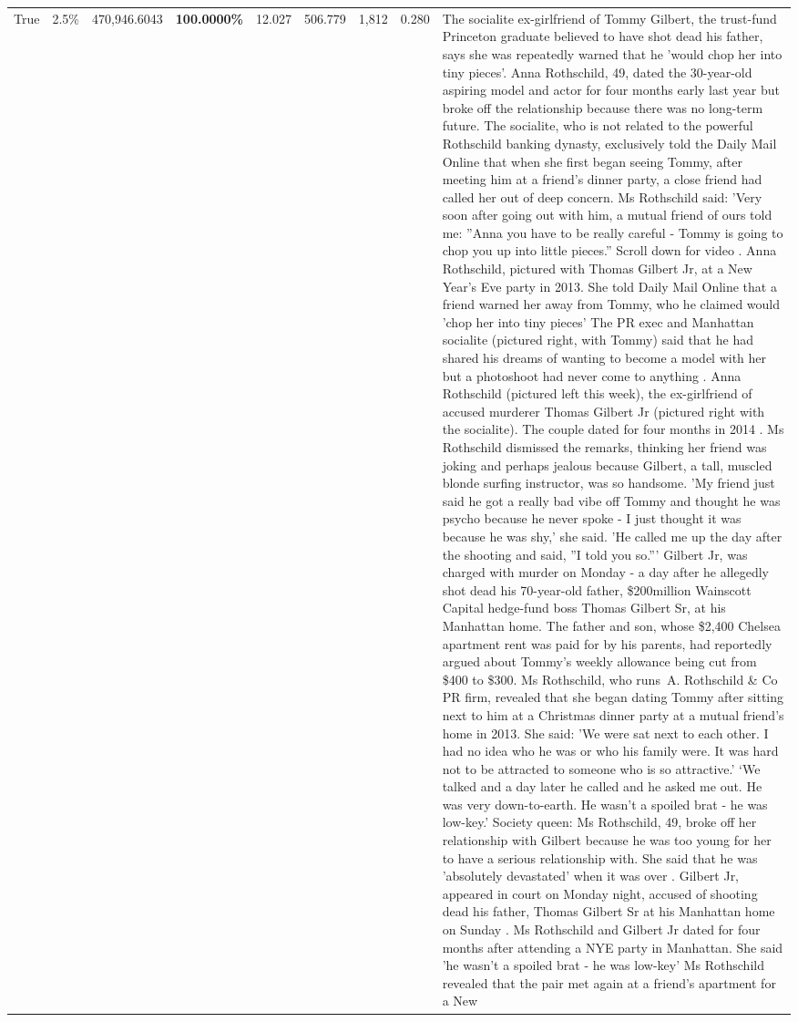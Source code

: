 \begin{table}[H]
\begin{tabular}{lllrlllll}
True & 2.5\% & 470,946.6043 & \bfseries \color{red} 100.0000\% & 12.027 & 506.779 & 1,812 & 0.280 & The socialite ex-girlfriend of Tommy Gilbert, the trust-fund Princeton graduate believed to have shot dead his father, says she was repeatedly warned that he 'would chop her into tiny pieces'. Anna Rothschild, 49, dated the 30-year-old aspiring model and actor for four months early last year but broke off the relationship because there was no long-term future. The socialite, who is not related to the powerful Rothschild banking dynasty, exclusively told the Daily Mail Online that when she first began seeing Tommy, after meeting him at a friend's dinner party, a close friend had called her out of deep concern. Ms Rothschild said: 'Very soon after going out with him, a mutual friend of ours told me: ''Anna you have to be really careful - Tommy is going to chop you up into little pieces.'' Scroll down for video . Anna Rothschild, pictured with Thomas Gilbert Jr, at a New Year's Eve party in 2013. She told Daily Mail Online that a friend warned her away from Tommy, who he claimed would 'chop her into tiny pieces' The PR exec and Manhattan socialite (pictured right, with Tommy) said that he had shared his dreams of wanting to become a model with her but a photoshoot had never come to anything . Anna Rothschild (pictured left this week), the ex-girlfriend of accused murderer Thomas Gilbert Jr (pictured right with the socialite). The couple dated for four months in 2014 . Ms Rothschild dismissed the remarks, thinking her friend was joking and perhaps jealous because Gilbert, a tall, muscled blonde surfing instructor, was so handsome. 'My friend just said he got a really bad vibe off Tommy and thought he was psycho because he never spoke - I just thought it was because he was shy,' she said. 'He called me up the day after the shooting and said, ''I told you so.''' Gilbert Jr, was charged with murder on Monday - a day after he allegedly shot dead his 70-year-old father, \$200million Wainscott Capital hedge-fund boss Thomas Gilbert Sr, at his Manhattan home. The father and son, whose \$2,400 Chelsea apartment rent was paid for by his parents, had reportedly argued about Tommy's weekly allowance being cut from \$400 to \$300. Ms Rothschild, who runs A. Rothschild \& Co PR firm, revealed that she began dating Tommy after sitting next to him at a Christmas dinner party at a mutual friend's home in 2013. She said: 'We were sat next to each other. I had no idea who he was or who his family were. It was hard not to be attracted to someone who is so attractive.' ‘We talked and a day later he called and he asked me out. He was very down-to-earth. He wasn’t a spoiled brat - he was low-key.’ Society queen: Ms Rothschild, 49, broke off her relationship with Gilbert because he was too young for her to have a serious relationship with. She said that he was 'absolutely devastated' when it was over . Gilbert Jr, appeared in court on Monday night, accused of shooting dead his father, Thomas Gilbert Sr at his Manhattan home on Sunday . Ms Rothschild and Gilbert Jr dated for four months after attending a NYE party in Manhattan. She said 'he wasn't a spoiled brat - he was low-key' Ms Rothschild revealed that the pair met again at a friend’s apartment for a New 
\end{tabular}
\end{table}
